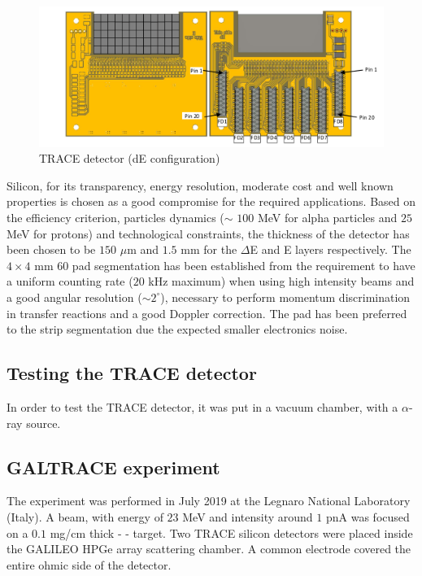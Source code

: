 \begin{figure}[h]
  \centering
  \includegraphics[scale=.65]{img/trace_de.png}
  \caption{TRACE detector (dE configuration)}
  \label{chain}
\end{figure}

\bigbreak

Silicon, for its transparency, energy resolution, moderate cost and
well known properties is chosen as a good compromise for the required
applications. Based on the efficiency criterion, particles dynamics ($\sim$
$100$ MeV for alpha particles and $25$ MeV for protons) and technological
constraints, the thickness of the detector has been chosen to be $150$ $\mu$m
and $1.5$ mm for the $\Delta$E and E layers respectively. The $4 \times 4$ mm
60 pad segmentation has been established from the requirement to have a uniform
counting rate ($20$ kHz maximum) when using high intensity beams and a good
angular resolution ($\sim 2^\circ$), necessary to perform momentum
discrimination in transfer reactions and a good Doppler correction. The pad
has been preferred to the strip segmentation due the expected smaller
electronics noise.

\subsection{Testing the TRACE detector}

In order to test the TRACE detector, it was put in a vacuum chamber, with a $\alpha$-ray source.

\subsection{GALTRACE experiment}

The experiment was performed in July 2019 at the Legnaro National Laboratory
(Italy). A  beam, with energy of $23$ MeV and intensity around $1$ pnA
was focused on a $0.1$ mg/cm thick  - - target.
Two TRACE silicon detectors were placed inside the GALILEO HPGe array
scattering chamber. A common electrode covered the entire ohmic side of the
detector.

